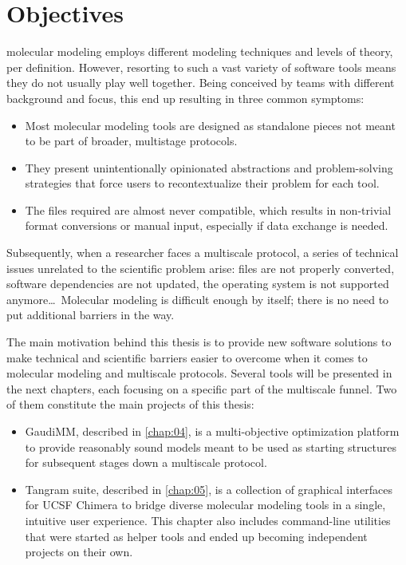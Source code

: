 \chapter{Objectives}
\label{chap:03}

 molecular modeling employs different modeling techniques and levels of theory, per definition. However, resorting to such a vast variety of software tools means they do not usually play well together. Being conceived by teams with different background and focus, this end up resulting in three common symptoms:

\begin{itemize}
	\item Most molecular modeling tools are designed as standalone pieces not meant to be part of broader, multistage protocols.

	\item They present unintentionally opinionated abstractions and problem-solving strategies that force users to recontextualize their problem for each tool.

	\item The files required are almost never compatible, which results in non-trivial format conversions or manual input, especially if data exchange is needed.
\end{itemize}

Subsequently, when a researcher faces a multiscale protocol, a series of technical issues unrelated to the scientific problem arise: files are not properly converted, software dependencies are not updated, the operating system is not supported anymore\ldots\ Molecular modeling is difficult enough by itself; there is no need to put additional barriers in the way.

The main motivation behind this thesis is to provide new software solutions to make technical and scientific barriers easier to overcome when it comes to molecular modeling and multiscale protocols. Several tools will be presented in the next chapters, each focusing on a specific part of the multiscale funnel. Two of them constitute the main projects of this thesis:

\newpage
\begin{itemize}
	\item GaudiMM, described in \autoref{chap:04}, is a multi-objective optimization platform to provide reasonably sound models meant to be used as starting structures for subsequent stages down a multiscale protocol.

	\item Tangram suite, described in \autoref{chap:05}, is a collection of graphical interfaces for UCSF Chimera to bridge diverse molecular modeling tools in a single, intuitive user experience. This chapter also includes command-line utilities that were started as helper tools and ended up becoming independent projects on their own.
\end{itemize}


